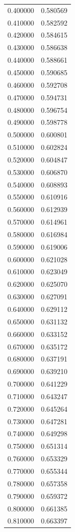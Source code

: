 \begin{tabular}{rr}
0.400000 & 0.580569 \\
0.410000 & 0.582592 \\
0.420000 & 0.584615 \\
0.430000 & 0.586638 \\
0.440000 & 0.588661 \\
0.450000 & 0.590685 \\
0.460000 & 0.592708 \\
0.470000 & 0.594731 \\
0.480000 & 0.596754 \\
0.490000 & 0.598778 \\
0.500000 & 0.600801 \\
0.510000 & 0.602824 \\
0.520000 & 0.604847 \\
0.530000 & 0.606870 \\
0.540000 & 0.608893 \\
0.550000 & 0.610916 \\
0.560000 & 0.612939 \\
0.570000 & 0.614961 \\
0.580000 & 0.616984 \\
0.590000 & 0.619006 \\
0.600000 & 0.621028 \\
0.610000 & 0.623049 \\
0.620000 & 0.625070 \\
0.630000 & 0.627091 \\
0.640000 & 0.629112 \\
0.650000 & 0.631132 \\
0.660000 & 0.633152 \\
0.670000 & 0.635172 \\
0.680000 & 0.637191 \\
0.690000 & 0.639210 \\
0.700000 & 0.641229 \\
0.710000 & 0.643247 \\
0.720000 & 0.645264 \\
0.730000 & 0.647281 \\
0.740000 & 0.649298 \\
0.750000 & 0.651314 \\
0.760000 & 0.653329 \\
0.770000 & 0.655344 \\
0.780000 & 0.657358 \\
0.790000 & 0.659372 \\
0.800000 & 0.661385 \\
0.810000 & 0.663397 \\

\end{tabular}
